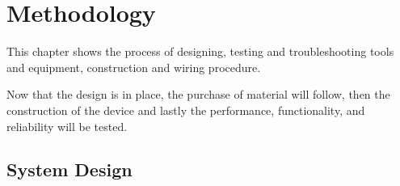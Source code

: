 \chapter{Methodology}

This chapter shows the process of designing, testing and troubleshooting tools and equipment, construction and wiring procedure.

Now that the design is in place, the purchase of material will follow, then the construction of the device and lastly the performance, 
functionality, and reliability will be tested.

\section{System Design}

\pagebreak

